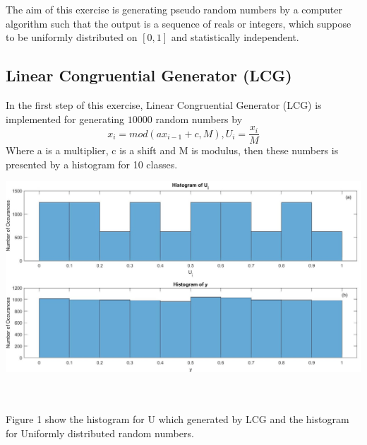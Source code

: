 The aim of this exercise is generating pseudo random numbers by a computer algorithm such that the output is a sequence of reals
or integers, which suppose to be uniformly distributed on $[0,1]$ and statistically independent.
\subsection{Linear Congruential Generator (LCG)}
In the first step of this exercise, Linear Congruential Generator (LCG) is implemented for generating $10000$ random numbers by
\begin{equation}
    x_i=mod(ax_{i-1}+c, M),              U_i=\frac{x_i}{M}
\end{equation}
Where a is a multiplier, c is a shift and M is modulus, then these numbers is presented by a histogram for 10 classes.
\begin{center}
    \includegraphics[scale=0.3]{Figures/figure1_1.jpg}\\
\end{center}\\
\\
Figure 1 show the histogram for U which generated by LCG and the histogram for Uniformly distributed random numbers.\\
